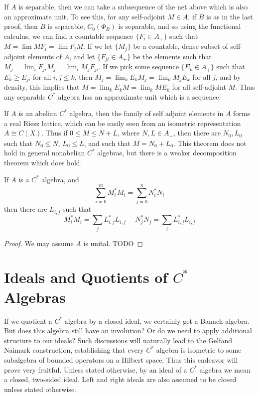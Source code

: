 \begin{remark}
    If $A$ is separable, then we can take a subsequence of the net above which is also an approximate unit. To see this, for any self-adjoint $M \in A$, if $B$ is as in the last proof, then $B$ is separable, $C_0(\Phi_B)$ is separable, and so using the functional calculus, we can find a countable sequence $\{ F_i \in A_+ \}$ such that $M = \lim MF_i = \lim F_iM$. If we let $\{ M_j \}$ be a countable, dense subset of self-adjoint elements of $A$, and let $\{ F_{ji} \in A_+ \}$ be the elements such that $M_j = \lim_i F_{ji} M_j = \lim_i M_j F_{ji}$. If we pick some sequence $\{ E_k \in A_+ \}$ such that $E_k \geq E_{ji}$ for all $i,j \leq k$, then $M_j = \lim_k E_k M_j = \lim_k M_j E_k$ for all $j$, and by density, this implies that $M = \lim_k E_k M = \lim_k M E_k$ for all self-adjoint $M$. Thus any separable $C^*$ algebra has an approximate unit which is a sequence.
\end{remark}

If $A$ is an abelian $C^*$ algebra, then the family of self adjoint elements in $A$ forms a real Riesz lattice, which can be easily seen from an isometric representation $A \cong C(X)$. Thus if $0 \leq M \leq N + L$, where $N,L \in A_+$, then there are $N_0,L_0$ such that $N_0 \leq N$, $L_0 \leq L$, and such that $M = N_0 + L_0$. This theorem does not hold in general nonabelian $C^*$ algebras, but there is a weaker decomposition theorem which does hold.

\begin{prop}
    If $A$ is a $C^*$ algebra, and
    \[ \sum_{i = 0}^m M_i^* M_i = \sum_{j = 0}^n N_i^* N_i \]
    then there are $L_{i,j}$ such that
    \[ M_i^* M_i = \sum_j L_{i,j}^* L_{i,j}\ \ \ \ \ \ N_j^* N_j = \sum_i L_{i,j}^* L_{i,j} \]
\end{prop}
\begin{proof}
    We may assume $A$ is unital. TODO
\end{proof}







\section{Ideals and Quotients of $C^*$ Algebras}

If we quotient a $C^*$ algebra by a closed ideal, we certainly get a Banach algebra. But does this algebra still have an involution? Or do we need to apply additional structure to our ideals? Such discussions will naturally lead to the Gelfand Naimark construction, establishing that every $C^*$ algebra is isometric to some subalgebra of bounded operators on a Hilbert space. Thus this endeavor will prove very fruitful. Unless stated otherwise, by an ideal of a $C^*$ algebra we mean a closed, two-sided ideal. Left and right ideals are also assumed to be closed unless stated otherwise.

